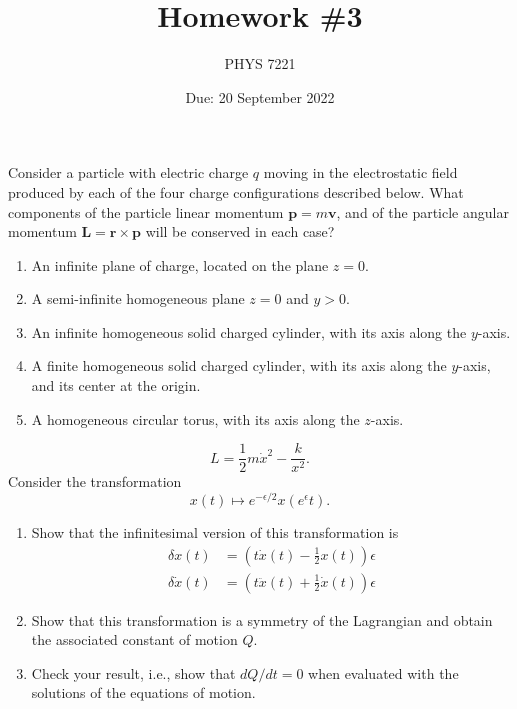 \documentclass{jhwhw}
\author{PHYS 7221}
\title{Homework \#3}
\date{Due: 20 September 2022}
\begin{document}

Consider a particle with electric charge $q$ moving in the electrostatic field produced by each of the four charge configurations described below. What components of the particle linear momentum $\mathbf p = m \mathbf v$, and of the particle angular momentum $\mathbf L = \mathbf r \times \mathbf p$ will be conserved in each case?
\begin{enumerate}
  \item An infinite plane of charge, located on the plane $z = 0$.
  \item A semi-infinite homogeneous plane $z = 0$ and $y > 0$.
  \item An infinite homogeneous solid charged cylinder, with its axis along the $y$-axis.
  \item A finite homogeneous solid charged cylinder, with its axis along the $y$-axis, and its center at the origin.
  \item A homogeneous circular torus, with its axis along the $z$-axis.
\end{enumerate}

\begin{equation}
  \label{eq:27}
  L =  \frac12 m \dot x^{2} - \frac{k}{x^{2}}.
\end{equation}
Consider the transformation
\begin{equation}
  \label{eq:1}
  x(t) \mapsto e^{- \epsilon / 2} x( e^{\epsilon} t ).
\end{equation}
\begin{enumerate}
  \item Show that the infinitesimal version of this transformation is
        \begin{equation}
          \label{eq:2}
          \begin{aligned}
            \delta x(t) & = \left( t \dot x(t) - \frac12 x(t) \right) \epsilon \\
              \delta \dot x(t) & = \left( t \ddot x(t) + \frac12 \dot x(t) \right) \epsilon
          \end{aligned}
        \end{equation}
  \item Show that this transformation is a symmetry of the Lagrangian and obtain the associated constant of motion $Q$.
  \item Check your result, i.e., show that $dQ/dt = 0$ when evaluated with the solutions of the equations of motion.
\end{enumerate}
\end{document}
